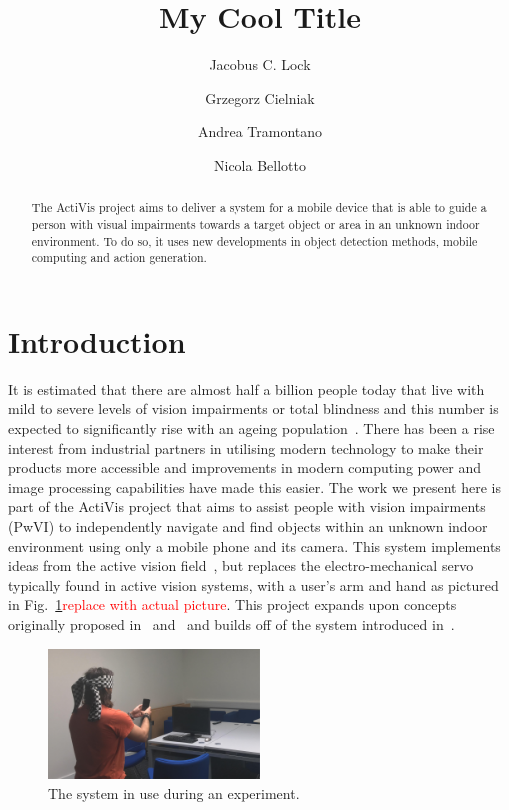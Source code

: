 \documentclass[runningheads]{llncs}
\newcommand\todo[1]{\textcolor{red}{#1}}
\begin{document}
\title{My Cool Title}

\author{Jacobus C. Lock \and
  Grzegorz Cielniak \and
  Andrea Tramontano \and
  Nicola Bellotto
}

\maketitle

\begin{abstract}
  The ActiVis project aims to deliver a system for a mobile device that is able to guide a person with visual impairments towards a target object or area in an unknown indoor environment. 
  To do so, it uses new developments in object detection methods, mobile computing and action generation. 
\end{abstract}

\section{Introduction}

It is estimated that there are almost half a billion people today that live with mild to severe levels of vision impairments or total blindness and this number is expected to significantly rise with an ageing population~\cite{bourne2017magnitude}.
There has been a rise interest from industrial partners in utilising modern technology to make their products more accessible and improvements in modern computing power and image processing capabilities have made this easier.
The work we present here is part of the ActiVis project that aims to assist people with vision impairments (PwVI) to independently navigate and find objects within an unknown indoor environment using only a mobile phone and its camera.
This system implements ideas from the active vision field~\cite{bajcsy2017,bellotto2013}, but replaces the electro-mechanical servo typically found in active vision systems, with a user's arm and hand as pictured in Fig.~\ref{fig:system-in-use}\todo{replace with actual picture}.
This project expands upon concepts originally proposed in~\cite{bellotto2013} and~\cite{lock2017portable} and builds off of the system introduced in~\cite{lock2019active}.

\begin{figure}
  \centering
  \includegraphics[width=0.5\textwidth]{figures/system_use.png}
  \caption{The system in use during an experiment. }\label{fig:system-in-use}
\end{figure}
\end{document}
